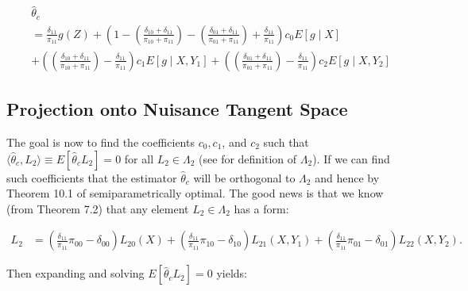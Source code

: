 \documentclass[12pt]{article}
\begin{document}
\begin{align}
  &\hat \theta_c \\ \nonumber
  &= \frac{\delta_{11}}{\pi_{11}} g(Z) + \left(1 -
    \left(\frac{\delta_{10} + \delta_{11}}{\pi_{10} + \pi_{11}}\right) -
    \left(\frac{\delta_{01} + \delta_{11}}{\pi_{01} + \pi_{11}}\right) + 
  \frac{\delta_{11}}{\pi_{11}}\right) c_0 E[g \mid X] \\ \nonumber
  &+
  \left(\left(\frac{\delta_{10} + \delta_{11}}{\pi_{10} + \pi_{11}}\right) - 
  \frac{\delta_{11}}{\pi_{11}}\right) c_1 E[g \mid X, Y_1] +
  \left(\left(\frac{\delta_{01} + \delta_{11}}{\pi_{01} + \pi_{11}}\right) - 
  \frac{\delta_{11}}{\pi_{11}}\right) c_2 E[g \mid X, Y_2]
\end{align}

\subsection*{Projection onto Nuisance Tangent Space}

The goal is now to find the coefficients $c_0, c_1$, and $c_2$ such that 
$\langle \hat \theta_c, L_2\rangle \equiv E[\hat \theta_c L_2] = 0$ for 
all $L_2 \in \Lambda_2$ (see \cite{tsiatis2006semiparametric} for definition 
of $\Lambda_2$). If we can find such coefficients that the estimator $\hat
\theta_c$ will be orthogonal to $\Lambda_2$ and hence by Theorem 10.1 of 
\cite{tsiatis2006semiparametric} semiparametrically optimal. The good news 
is that we know (from Theorem 7.2) that any element $L_2 \in \Lambda_2$ has a
form:

\begin{align}
  L_2 &= 
  \left(\frac{\delta_{11}}{\pi_{11}}\pi_{00} - \delta_{00}\right) L_{20}(X) +
  \left(\frac{\delta_{11}}{\pi_{11}}\pi_{10} - \delta_{10}\right) L_{21}(X, Y_1) +
  \left(\frac{\delta_{11}}{\pi_{11}}\pi_{01} - \delta_{01}\right) L_{22}(X, Y_2).
\end{align}

Then expanding and solving $E[\hat \theta_c L_2] = 0$ yields:
\end{document}
